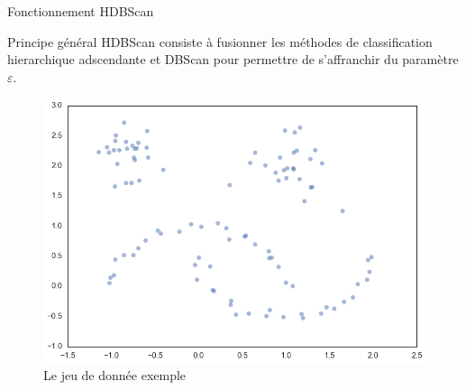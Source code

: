 \begin{frame}{Fonctionnement HDBScan\footnotemark[2] }
    \begin{block}{Principe général}
        HDBScan consiste à fusionner les méthodes de classification hierarchique adscendante et DBScan pour permettre de s'affranchir du paramètre $\varepsilon$.
    \end{block}


    \begin{figure}
        \includegraphics[width=0.5\paperheight]{images/Illustration-HDBSCAN-1.png}
        \caption{\label{fig:ill_HDBScan_1}Le jeu de donnée exemple \footnotemark[3]}
    \end{figure}

\end{frame}


